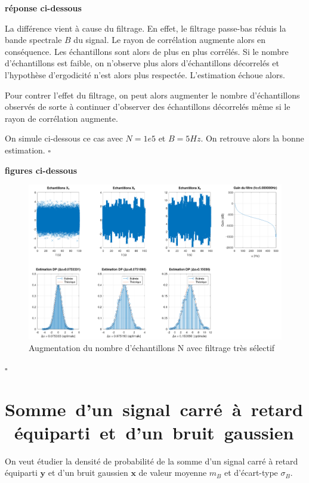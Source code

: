\documentclass{article}
\newcommand{\debutrep}[1]{\color{blue}\begin{center} \hrulefill \textbf{ #1 } \hrulefill \end{center} }
\newcommand{\finrep}{\vspace*{5mm}\hfill $\square$\color{black}\vspace*{5mm}}
\begin{document}
\begin{list}{}{\setlength{\leftmargin}{6mm} \setlength{\labelwidth}{20mm} \setlength{\labelsep}{2mm} \setlength{\itemsep}{1mm} }
\debutrep{réponse ci-dessous}
La différence vient à cause du filtrage. En effet, le filtrage passe-bas réduis la bande spectrale $B$ du signal. Le rayon de corrélation augmente alors en conséquence. Les échantillons sont alors de plus en plus corrélés. Si le nombre d'échantillons est faible, on n'observe plus alors d'échantillons décorrelés et l'hypothèse d'ergodicité n'est alors plus respectée. L'estimation échoue alors.

Pour contrer l'effet du filtrage, on peut alors augmenter le nombre d'échantillons observés de sorte à continuer d'observer des échantillons décorrelés même si le rayon de corrélation augmente.

On simule ci-dessous ce cas avec $N=1e5$ et $B=5Hz$. On retrouve alors la bonne estimation.
\finrep

\debutrep{figures ci-dessous}
\begin{figure} [H]
    \centering
    \includegraphics[width=1.15\columnwidth]{NaugBvar.png}
    \caption{Augmentation du nombre d'échantillons N avec filtrage très sélectif}
\end{figure}
\finrep


\end{list}

\clearpage 
\section{\mbox{Somme d'un signal carré à retard équiparti et d'un bruit gaussien}}

On veut étudier la densité de probabilité de la somme d'un signal carré à retard équiparti $\mathbf{y}$ et d'un bruit gaussien  $\mathbf{x}$ de valeur moyenne $m_B$ et d'écart-type $\sigma_B$.\\
\end{document}
